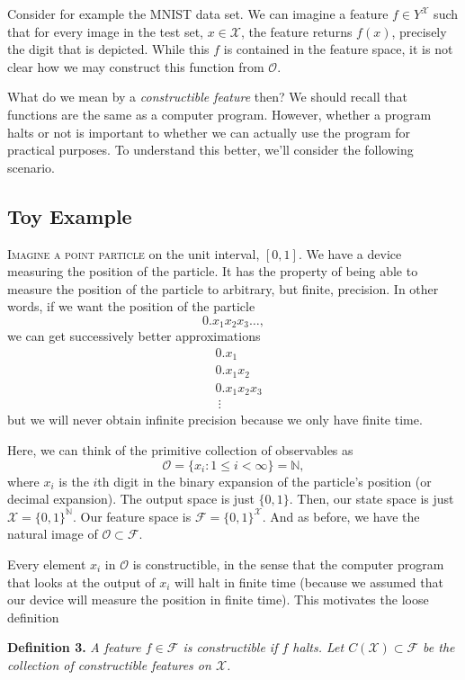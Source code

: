 \documentclass[10]{article}
\providecommand{\bbN}{\mathbb{N}}
\theoremstyle{plain}
\begin{document}
Consider for example the MNIST data set. We can imagine a feature $f \in Y^\mathcal{X}$ such that for every image in the test set, $x \in \mathcal{X}$, the feature returns $f(x)$, precisely the digit that is depicted. While this $f$ is contained in the feature space, it is not clear how we may construct this function from $\mathcal{O}$.

What do we mean by a \emph{constructible feature} then? We should recall that functions are the same as a computer program. However, whether a program halts or not is important to whether we can actually use the program for practical purposes. To understand this better, we'll consider the following scenario.

\subsection{Toy Example}
\textsc{Imagine a point particle} on the unit interval, $[0,1]$. We have a device measuring the position of the particle. It has the property of being able to measure the position of the particle to arbitrary, but finite, precision. In other words, if we want the position of the particle
\[0.x_1x_2x_3\dotsc,\]
we can get successively better approximations
\begin{align*}
    &0.x_1\\
    &0.x_1x_2\\
    &0.x_1x_2x_3\\
    &\ \vdots
\end{align*}
but we will never obtain infinite precision because we only have finite time. 

Here, we can think of the primitive collection of observables as 
\[\mathcal{O} = \{x_i: 1 \leq i < \infty\} = \bbN,\]
where $x_i$ is the $i$th digit in the binary expansion of the particle's position (or decimal expansion). The output space is just $\{0,1\}$. Then, our state space is just $\mathcal{X} = \{0,1\}^\bbN$. Our feature space is $\mathcal{F} = \{0,1\}^\mathcal{X}$. And as before, we have the natural image of $\mathcal{O} \subset \mathcal{F}$.

Every element $x_i$ in $\mathcal{O}$ is constructible, in the sense that the computer program that looks at the output of $x_i$ will halt in finite time (because we assumed that our device will measure the position in finite time). This motivates the loose definition

\textbf{Definition 3.} \emph{A feature $f \in \mathcal{F}$ is \emph{constructible} if $f$ halts. Let $C(\mathcal{X}) \subset \mathcal{F}$ be the collection of constructible features on $\mathcal{X}$.}
\end{document}
